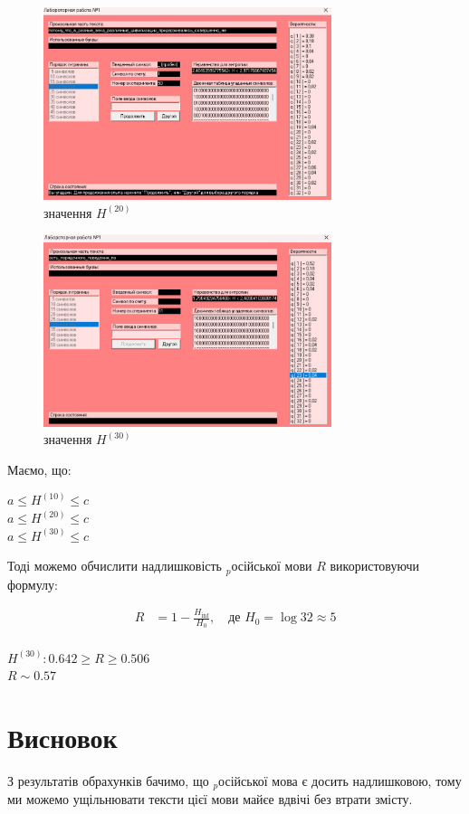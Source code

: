 \documentclass[12pt]{article}
\begin{document}
\begin{figure}[htbp]
    \centering
    \includegraphics[width=0.75\textwidth]{screenshots/h20.png}
    \caption{значення \(H^{(20)}\)}
    \label{fig:screenshot}
\end{figure}

\begin{figure}[htbp]
    \centering
    \includegraphics[width=0.75\textwidth]{screenshots/h30.png}
    \caption{значення \(H^{(30)}\)}
    \label{fig:screenshot}
\end{figure}

\newpage
\quad Маємо, що:\\
\begin{center}
$a \leq H^{(10)} \leq c$ \\
$a \leq H^{(20)} \leq c$ \\
$a \leq H^{(30)} \leq c$ \\
\end{center}

Тоді можемо обчислити надлишковість $_{p}$осійської мови \( R \) використовуючи формулу: 

\begin{align*}
R &= 1 - \frac{H_{\text{inf}}}{H_0},
\quad \text{де } H_0 = \log 32 \approx 5 \\
\end{align*}

\begin{center}
$H^{(30)}: 0.642 \geq R \geq 0.506$ \\
$R \sim 0.57$
\end{center}

\section{Висновок}
\quad З результатів обрахунків бачимо, що $_{p}$осійської мова є досить надлишковою, тому ми можемо ущільнювати тексти цієї мови майєе вдвічі без втрати змісту.
\end{document}
